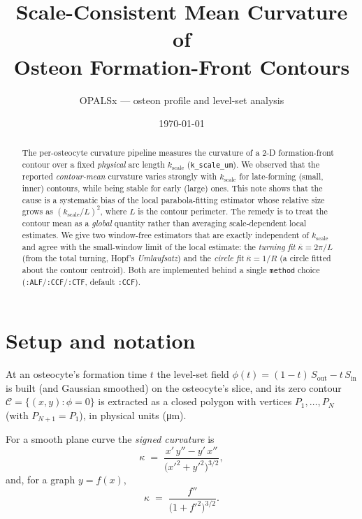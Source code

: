 \documentclass[11pt]{article}
\title{\textbf{Scale-Consistent Mean Curvature of\\ Osteon Formation-Front Contours}}
\author{OPALSx --- osteon profile and level-set analysis}
\date{\today}
\newcommand{\kbar}{\overline{\kappa}}
\newcommand{\um}{\si{\micro\meter}}
\newcommand{\code}[1]{\texttt{#1}}
\begin{document}
\maketitle

\begin{abstract}
The per-osteocyte curvature pipeline measures the curvature of a 2-D
formation-front contour over a fixed \emph{physical} arc length
$k_{\text{scale}}$ (\code{k\_scale\_um}). We observed that the reported
\emph{contour-mean} curvature varies strongly with $k_{\text{scale}}$ for
late-forming (small, inner) contours, while being stable for early (large) ones.
This note shows that the cause is a systematic bias of the local
parabola-fitting estimator whose relative size grows as
$(k_{\text{scale}}/L)^2$, where $L$ is the contour perimeter. The remedy is to
treat the contour mean as a \emph{global} quantity rather than averaging
scale-dependent local estimates. We give two window-free estimators that are
exactly independent of $k_{\text{scale}}$ and agree with the small-window limit of
the local estimate: the \emph{turning fit} $\kbar=2\pi/L$ (from the total turning,
Hopf's \emph{Umlaufsatz}) and the \emph{circle fit} $\kbar=1/R$ (a circle fitted
about the contour centroid). Both are implemented behind a single
\code{method} choice (\code{:ALF}/\code{:CCF}/\code{:CTF}, default
\code{:CCF}).
\end{abstract}

\section{Setup and notation}
\label{sec:setup}

At an osteocyte's formation time $t$ the level-set field
$\phi(t) = (1-t)\,S_{\text{out}} - t\,S_{\text{in}}$ is built (and Gaussian
smoothed) on the osteocyte's slice, and its zero contour
$\mathcal{C} = \{(x,y) : \phi = 0\}$ is extracted as a closed polygon with
vertices $P_1,\dots,P_N$ (with $P_{N+1}=P_1$), in physical units (\um).

For a smooth plane curve the \emph{signed curvature} is
\begin{equation}
  \kappa \;=\; \frac{x'\,y'' - y'\,x''}{\bigl(x'^2+y'^2\bigr)^{3/2}},
  \label{eq:kappa-def}
\end{equation}
and, for a graph $y=f(x)$,
\begin{equation}
  \kappa \;=\; \frac{f''}{\bigl(1+f'^2\bigr)^{3/2}}.
  \label{eq:kappa-graph}
\end{equation}
\end{document}
